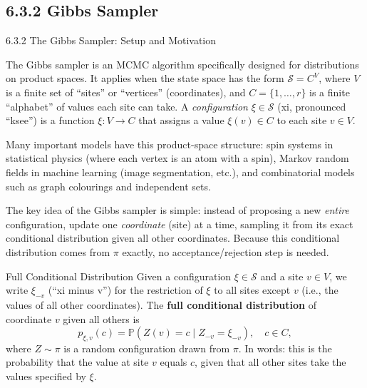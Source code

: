 \documentclass[aspectratio=169,10pt]{beamer}
\newcommand{\PP}{\mathbb{P}}
\begin{document}
\subsection{6.3.2 Gibbs Sampler}

\begin{frame}[allowframebreaks]{6.3.2 The Gibbs Sampler: Setup and Motivation}

The Gibbs sampler is an MCMC algorithm specifically designed for distributions on product spaces.
It applies when the state space has the form $\mathcal{S} = C^V$, where $V$ is a finite set of ``sites'' or ``vertices'' (coordinates), and $C = \{1, \ldots, r\}$ is a finite ``alphabet'' of values each site can take.
A \emph{configuration} $\xi \in \mathcal{S}$ (xi, pronounced ``ksee'') is a function $\xi : V \to C$ that assigns a value $\xi(v) \in C$ to each site $v \in V$.

Many important models have this product-space structure: spin systems in statistical physics (where each vertex is an atom with a spin), Markov random fields in machine learning (image segmentation, etc.), and combinatorial models such as graph colourings and independent sets.

The key idea of the Gibbs sampler is simple: instead of proposing a new \emph{entire} configuration, update one \emph{coordinate} (site) at a time, sampling it from its exact conditional distribution given all other coordinates.
Because this conditional distribution comes from $\pi$ exactly, no acceptance/rejection step is needed.

\begin{block}{Full Conditional Distribution}
Given a configuration $\xi \in \mathcal{S}$ and a site $v \in V$, we write $\xi_{-v}$ (``xi minus v'') for the restriction of $\xi$ to all sites except $v$ (i.e., the values of all other coordinates).
The \textbf{full conditional distribution} of coordinate $v$ given all others is
\[
  p_{\xi,v}(c) = \PP(Z(v) = c \mid Z_{-v} = \xi_{-v}), \quad c \in C,
\]
where $Z \sim \pi$ is a random configuration drawn from $\pi$.
In words: this is the probability that the value at site $v$ equals $c$, given that all other sites take the values specified by $\xi$.
\end{block}

\framebreak


\end{frame}
\end{document}
